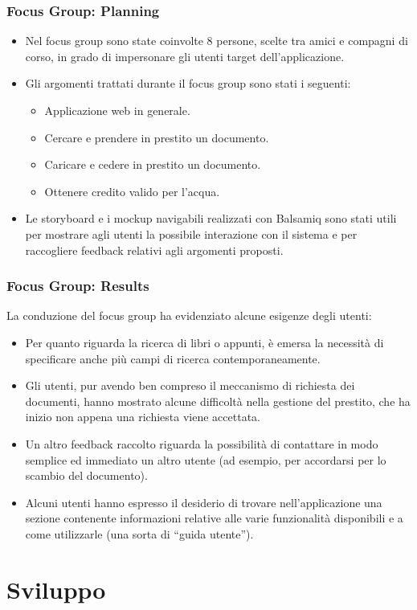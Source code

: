 \documentclass{beamer}
\begin{document}
\begin{frame}
\frametitle{Focus Group: Planning}
\begin{itemize}
\item Nel focus group sono state coinvolte 8 persone, scelte tra amici e compagni di corso, in grado di impersonare gli utenti target dell'applicazione.
\item Gli argomenti trattati durante il focus group sono stati i seguenti: 
\begin{itemize}
\item Applicazione web in generale.
\item Cercare e prendere in prestito un documento.
\item Caricare e cedere in prestito un documento.
\item Ottenere credito valido per l'acqua.
\end{itemize}
\item Le storyboard e i mockup navigabili realizzati con Balsamiq sono stati utili per mostrare agli utenti la possibile interazione con il sistema e per raccogliere feedback relativi agli argomenti proposti.
\end{itemize}
\end{frame}
\begin{frame}
\frametitle{Focus Group: Results}
La conduzione del focus group ha evidenziato alcune esigenze degli utenti:
\begin{itemize}
\item Per quanto riguarda la ricerca di libri o appunti, è emersa la necessità di specificare anche più campi di ricerca contemporaneamente.
\item Gli utenti, pur avendo ben compreso il meccanismo di richiesta dei documenti, hanno mostrato alcune difficoltà nella gestione del prestito, che ha inizio non appena una richiesta viene accettata.
\item Un altro feedback raccolto riguarda la possibilità di contattare in modo semplice ed immediato un altro utente (ad esempio, per accordarsi per lo scambio del documento).
\item Alcuni utenti hanno espresso il desiderio di trovare nell'applicazione una sezione contenente informazioni relative alle varie funzionalità disponibili e a come utilizzarle (una sorta di “guida utente”).
\end{itemize}
\end{frame}

\section{Sviluppo}
\end{document}
